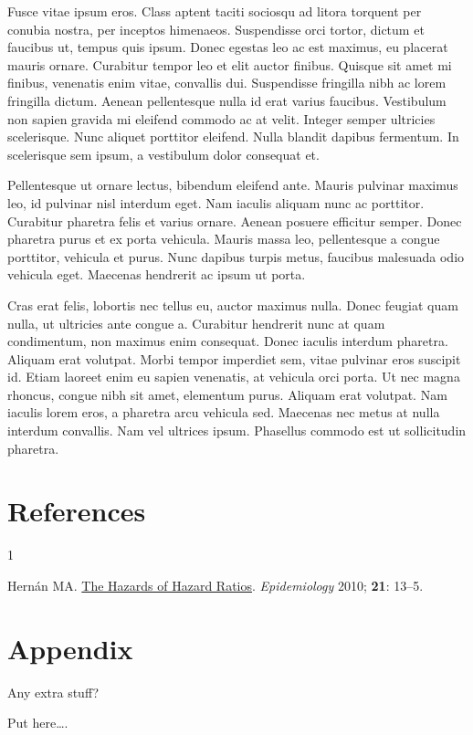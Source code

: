 \documentclass[
  11pt,
  a4paper,
]{scrreprt}
\newlength{\cslhangindent}
\newlength{\csllabelwidth}
\newenvironment{CSLReferences}[2] %
 {\begin{list}{}{%
  \setlength{\itemindent}{0pt}
  \setlength{\leftmargin}{0pt}
  \setlength{\parsep}{0pt}
  \ifodd #1
   \setlength{\leftmargin}{\cslhangindent}
   \setlength{\itemindent}{-1\cslhangindent}
  \fi
  \setlength{\itemsep}{#2\baselineskip}}}
 {\end{list}}
\newcommand{\CSLLeftMargin}[1]{\parbox[t]{\csllabelwidth}{\strut#1\strut}}
\newcommand{\CSLRightInline}[1]{\parbox[t]{\linewidth - \csllabelwidth}{\strut#1\strut}}
\begin{document}
Fusce vitae ipsum eros. Class aptent taciti sociosqu ad litora torquent
per conubia nostra, per inceptos himenaeos. Suspendisse orci tortor,
dictum et faucibus ut, tempus quis ipsum. Donec egestas leo ac est
maximus, eu placerat mauris ornare. Curabitur tempor leo et elit auctor
finibus. Quisque sit amet mi finibus, venenatis enim vitae, convallis
dui. Suspendisse fringilla nibh ac lorem fringilla dictum. Aenean
pellentesque nulla id erat varius faucibus. Vestibulum non sapien
gravida mi eleifend commodo ac at velit. Integer semper ultricies
scelerisque. Nunc aliquet porttitor eleifend. Nulla blandit dapibus
fermentum. In scelerisque sem ipsum, a vestibulum dolor consequat et.

Pellentesque ut ornare lectus, bibendum eleifend ante. Mauris pulvinar
maximus leo, id pulvinar nisl interdum eget. Nam iaculis aliquam nunc ac
porttitor. Curabitur pharetra felis et varius ornare. Aenean posuere
efficitur semper. Donec pharetra purus et ex porta vehicula. Mauris
massa leo, pellentesque a congue porttitor, vehicula et purus. Nunc
dapibus turpis metus, faucibus malesuada odio vehicula eget. Maecenas
hendrerit ac ipsum ut porta.

Cras erat felis, lobortis nec tellus eu, auctor maximus nulla. Donec
feugiat quam nulla, ut ultricies ante congue a. Curabitur hendrerit nunc
at quam condimentum, non maximus enim consequat. Donec iaculis interdum
pharetra. Aliquam erat volutpat. Morbi tempor imperdiet sem, vitae
pulvinar eros suscipit id. Etiam laoreet enim eu sapien venenatis, at
vehicula orci porta. Ut nec magna rhoncus, congue nibh sit amet,
elementum purus. Aliquam erat volutpat. Nam iaculis lorem eros, a
pharetra arcu vehicula sed. Maecenas nec metus at nulla interdum
convallis. Nam vel ultrices ipsum. Phasellus commodo est ut sollicitudin
pharetra.


\chapter*{References}\label{references}


\begingroup
\raggedright

\label{refs}
\begin{CSLReferences}{0}{1}
\CSLLeftMargin{1 }%
\CSLRightInline{Hernán MA.
\href{https://doi.org/10.1097/EDE.0b013e3181c1ea43}{The Hazards of
Hazard Ratios}. \emph{Epidemiology} 2010; \textbf{21}: 13--5.}

\end{CSLReferences}

\endgroup


\chapter*{Appendix}\label{appendix}


Any extra stuff?

Put here\ldots.
\end{document}
